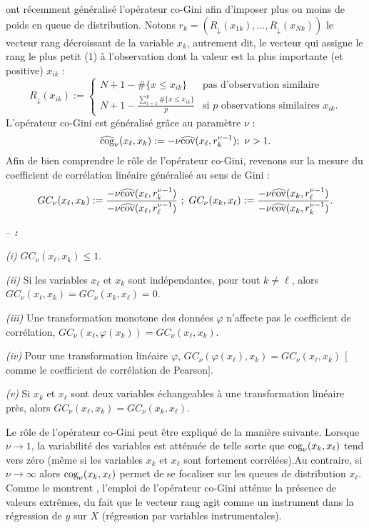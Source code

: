 \citet{Schechtman03} ont récemment généralisé l'opérateur co-Gini afin d'imposer plus ou moins de poids en queue de distribution. Notons $r_{k}=(R_\downarrow(x_{1k}),\ldots, R_\downarrow(x_{Nk}))$ le vecteur rang décroissant de la variable $x_k$, autrement dit, le vecteur qui assigne le rang le plus petit (1) à l'observation dont la valeur est la plus importante (et positive) $x_{ik}$ :
\[
R_\downarrow(x_{ik}) :=
\left\{ \begin{array}{ll}
N+1- \#\{x \leq x_{ik} \} & \text{pas d'observation similaire} \\
N+1-\frac{\sum_{i=1}^p \#\{ x \leq x_{ik}  \}}{p} & \text{si $p$ observations similaires $x_{ik}$.}
\end{array}
\right.
\]
L'opérateur co-Gini est généralisé grâce au paramètre $\nu$ :
\begin{equation}\label{cogg}
\widehat{\text{cog}}_\nu(x_\ell,x_k) := -\nu \widehat{\text{cov}}(x_\ell,r_{k}^{\nu-1}) ;  \ \nu > 1.
\end{equation}
Afin de bien comprendre le rôle de l'opérateur co-Gini, revenons sur la mesure du coefficient de corrélation linéaire généralisé au sens de Gini :
\[
GC_\nu(x_\ell,x_k) := \frac{-\nu \widehat{\text{cov}}(x_\ell,r_{k}^{\nu-1})}{-\nu \widehat{\text{cov}}(x_\ell,r_{\ell}^{\nu-1})} \ ; \ GC_\nu(x_k,x_\ell) := \frac{-\nu \widehat{\text{cov}}(x_k,r_{\ell}^{\nu-1})}{-\nu \widehat{\text{cov}}(x_k,r_{k}^{\nu-1})}.
\]

\begin{property}\label{prop1} -- \textbf{\emph{\citet{Schechtman03}:}}
	
	\noindent \emph{(i)} $GC_\nu(x_\ell,x_k) \leq 1$.
	
	\noindent\emph{(ii)} Si les variables $x_\ell$ et $x_k$ sont indépendantes, pour tout $k\neq \ell$, alors $GC_\nu(x_\ell,x_k) = GC_\nu(x_k,x_\ell) =0$.
	
	\noindent\emph{(iii)} Une transformation monotone des données $\varphi$ n'affecte pas le coefficient de corrélation, $GC_\nu(x_\ell,\varphi(x_k)) = GC_\nu(x_\ell,x_k)$.
	
	\noindent\emph{(iv)} Pour une transformation linéaire $\varphi$, $GC_\nu(\varphi(x_\ell),x_k) = GC_\nu(x_\ell,x_k)$ $[$comme le coefficient de corrélation de Pearson$]$.
	
	\noindent\emph{(v)} Si $x_k$ et $x_\ell$ sont deux variables échangeables à une transformation linéaire près, alors $GC_\nu(x_\ell,x_k) = GC_\nu(x_k,x_\ell)$.
\end{property}

Le rôle de l'opérateur co-Gini peut être expliqué de la manière suivante. Lorsque $\nu \rightarrow 1$, la variabilité des variables est atténuée de telle sorte que $\text{cog}_\nu(x_k,x_\ell)$ tend vers zéro (même si les variables $x_k$ et $x_\ell$ sont fortement corrélées).Au contraire, si $\nu \rightarrow \infty $ alors $\text{cog}_\nu(x_k,x_\ell)$ permet de se focaliser sur les queues de distribution $x_\ell$. Comme le montrent \citet{olkin1992gini}, l'emploi de l'opérateur co-Gini atténue la présence de valeurs extrêmes, du fait que le vecteur rang agit comme un instrument dans la régression de $y$ sur $X$ (régression par variables instrumentales).    

